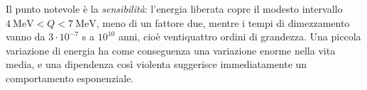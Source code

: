 Il punto notevole è la \emph{sensibilità}: l'energia liberata copre il modesto intervallo $4 \ \mathrm{MeV} < Q < 7 \ \mathrm{MeV}$, meno di un fattore due, mentre i tempi di dimezzamento vanno da $3 \cdot 10^{-7}$ s a $10^{10}$ anni, cioè ventiquattro ordini di grandezza. Una piccola variazione di energia ha come conseguenza una variazione enorme nella vita media, e una dipendenza così violenta suggerisce immediatamente un comportamento esponenziale.






